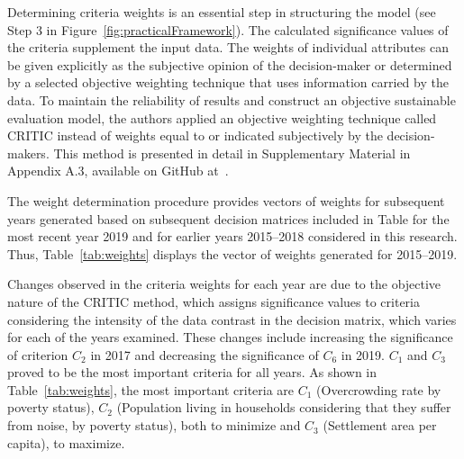 \documentclass[5p,times]{elsarticle}
\begin{document}
Determining criteria weights is an essential step in structuring the model (see Step 3 in Figure~\ref{fig:practicalFramework}). The calculated significance values of the criteria supplement the input data. The weights of individual attributes can be given explicitly as the subjective opinion of the decision-maker or determined by a selected objective weighting technique that uses information carried by the data. To maintain the reliability of results and construct an objective sustainable evaluation model, the authors applied an objective weighting technique called CRITIC instead of weights equal to or indicated subjectively by the decision-makers. This method is presented in detail in Supplementary Material in Appendix A.3, available on GitHub at~\cite{dariagithub2022}.

The weight determination procedure provides vectors of weights for subsequent years generated based on subsequent decision matrices included in Table for the most recent year 2019 and for earlier years 2015--2018 considered in this research.
Thus, Table~\ref{tab:weights} displays the vector of weights generated for 2015--2019.
%
\begin{table}[H]
\caption{Criteria weights calculated with CRITIC method for evaluated periods (years)}
\label{tab:weights}
\end{table}
%
Changes observed in the criteria weights for each year are due to the objective nature of the CRITIC method, which assigns significance values to criteria considering the intensity of the data contrast in the decision matrix, which varies for each of the years examined. These changes include increasing the significance of criterion $C_{2}$ in 2017 and decreasing the significance of $C_{6}$ in 2019. $C_{1}$ and $C_{3}$ proved to be the most important criteria for all years.
As shown in Table~\ref{tab:weights}, the most important criteria are $C_{1}$ (Overcrowding rate by poverty status), $C_{2}$ (Population living in households considering that they suffer from noise, by poverty status), both to minimize and $C_{3}$ (Settlement area per capita), to maximize.
\end{document}
